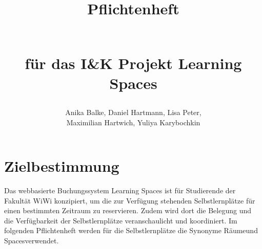 \documentclass[a4paper,report,headsepline]{scrreprt}
\begin{document}
\title{ \begin{Huge}
\textbf{Pflichtenheft}
\end{Huge} \\ f{\"u}r das I\&K Projekt \dq Learning Spaces\dq}
\author{Anika Balke, Daniel Hartmann, Lisa Peter, \\ Maximilian Hartwich, Yuliya Karybochkin}

\maketitle


\tableofcontents
\clearpage



\chapter{Zielbestimmung}\label{zielbestimmung}
Das webbasierte Buchungssystem \dq Learning Spaces \dq ist für Studierende der
Fakultät WiWi konzipiert, um die zur Verfügung stehenden Selbstlernplätze
für einen bestimmten Zeitraum zu reservieren. Zudem wird dort die Belegung
und die Verfügbarkeit der Selbstlernplätze veranschaulicht und koordiniert. Im folgenden Pflichtenheft werden für die Selbstlernplätze die Synonyme \dq Räume\dq und \dq Spaces\dq verwendet.
\end{document}
